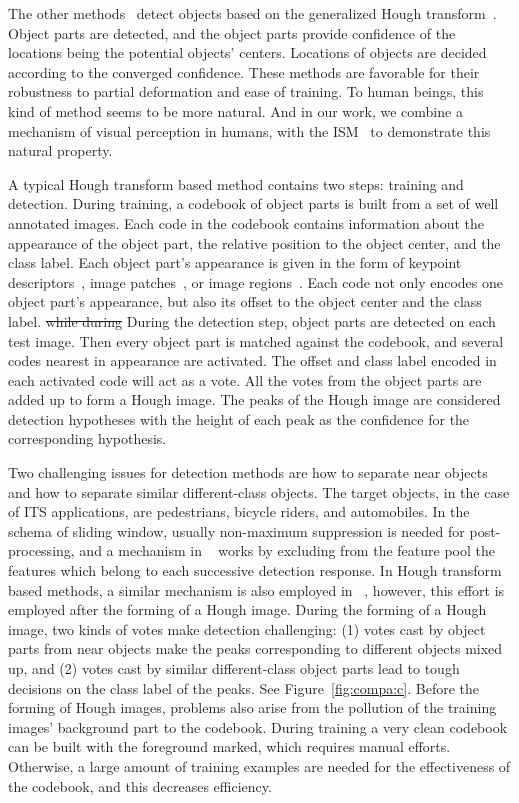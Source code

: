 \documentclass{mva2011}
\begin{document}
The other methods~\cite{lb1,ac2,ac3,ac18} detect objects based on the generalized Hough transform~\cite{ac17}. Object parts are detected, and the object parts provide confidence of the locations being the potential objects' centers. Locations of objects are decided according to the converged confidence. These methods are favorable for their robustness to partial deformation and ease of training. To human beings, this kind of method seems to be more natural. And in our work, we combine a mechanism of visual perception in humans, with the ISM~\cite{lb1} to demonstrate this natural property.





A typical Hough transform based method contains two steps: training and detection. During training, a codebook of object parts is built from a set of well annotated images. Each code in the codebook contains information about the appearance of the object part, the relative position to the object center, and the class label. Each object part's appearance is given in the form of keypoint descriptors~\cite{lb1}, image patches~\cite{ac6,ac7}, or image regions~\cite{ac8}. Each code not only encodes one object part's appearance, but also its offset to the object center and the class label. \sout{while during} {\color{red}During} the detection step, object parts are detected on each test image. Then every object part is matched against the codebook, and  several codes nearest in appearance are activated. The offset and class label encoded in each activated code will act as a vote. All the votes from the object parts are added up to form a Hough image. The peaks of the Hough image are considered  detection hypotheses with the height of each peak as the confidence for the corresponding hypothesis.

Two challenging issues for detection methods are how to separate near objects and how to separate similar different-class objects. The target objects, in the case of ITS applications, are pedestrians, bicycle riders, and automobiles. In the schema of sliding window, usually  non-maximum suppression is needed for post-processing, and a mechanism in ~\cite{ac4} works by excluding from the feature pool the features which belong to each successive detection response. In Hough transform based methods, a similar mechanism is also employed in ~\cite{ac9}, however, this effort is employed after the forming of a Hough image. During the forming of a Hough image, two kinds of votes make detection challenging: (1) votes cast by object parts from near objects make the peaks corresponding to different objects mixed up, and (2) votes cast by similar different-class object parts lead to tough decisions on the class label of the peaks. See Figure~\ref{fig:compa:c}. Before the forming of Hough images, problems also arise from the pollution of the training images' background part to the codebook. During training a very clean codebook can be built with the foreground marked, which requires manual efforts. Otherwise, a large amount of training examples are needed for the effectiveness of the codebook, and this decreases efficiency.
\end{document}
